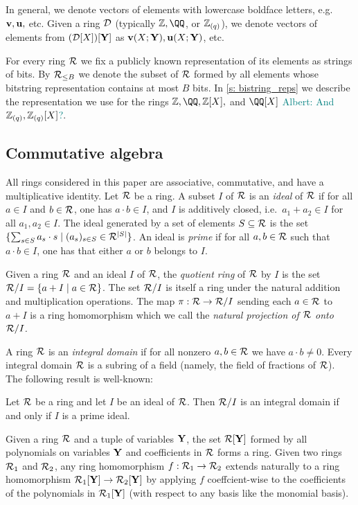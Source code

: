 \documentclass[11pt,letterpaper,usenames,dvipsnames]{article}
\newcommand{\albert}[1]{\textcolor{teal}{Albert: {#1}}}
\begin{document}
In general, we denote vectors of elements with lowercase boldface letters, e.g.\ $\mathbf{v},\mathbf{u},$ etc. Given a ring $\mathcal{D}$ (typically $\ZZ, \QQ$, or $\mathbb{Z}_{(q)}$), we denote vectors of elements from $(\mathcal{D}[X])[\mathbf{Y}]$ as $\mathbf{v}(X;\mathbf{Y}), \mathbf{u}(X;\mathbf{Y})$, etc.


For every ring $\mathcal{R}$  we fix a publicly known representation of its elements as strings of bits. By $\mathcal{R}_{\leq B}$ we denote the subset of $\mathcal{R}$ formed by all elements whose bitstring representation contains at most $B$ bits. In \cref{s: bistring_reps} we describe the representation we use for the rings $\ZZ,\QQ, \ZZ[X],$ and $\QQ[X]$ \albert{And $\mathbb{Z}_{(q)},\mathbb{Z}_{(q)}[X]$?}.


\subsection{Commutative algebra}
All rings considered in this paper are associative, commutative, and have a multiplicative identity. Let $\mathcal{R}$ be a ring. A subset $I$ of $\mathcal{R}$ is an \emph{ideal} of $\mathcal{R}$ if for all $a\in I$ and $b\in \mathcal{R}$, one has $a\cdot b \in I$, and $I$ is additively closed, i.e.\ $a_1 + a_2 \in I$ for all $a_1, a_2\in I$. The ideal generated by a set of elements $S\subseteq \mathcal{R}$ is the set $\{\sum_{s\in S} a_s \cdot s \mid (a_s)_{s\in S}\in \mathcal{R}^{|S|}\}$. An ideal is \emph{prime} if for all $a,b\in \mathcal{R}$ such that $a\cdot b \in I$, one has that either $a$ or $b$ belongs to $I$. 

Given a ring $\mathcal{R}$ and an ideal $I$ of $\mathcal{R}$, the \emph{quotient ring} of $\mathcal{R}$ by $I$ is the set  $\mathcal{R}/I =\{a+I \mid a\in \mathcal{R}\}$. The set $\mathcal{R}/I$ is itself a ring under the natural addition and multiplication operations.  The map $\pi:\mathcal{R}\to \mathcal{R}/I$ sending each $a\in \mathcal{R}$ to $a+I$ is a ring homomorphism which we call the \emph{natural projection of $\mathcal{R}$ onto $\mathcal{R}/I$.}

A ring $\mathcal{R}$ is an \emph{integral domain} if for all nonzero $a,b\in \mathcal{R}$ we have $a\cdot b\neq 0$. Every integral domain $\mathcal{R}$ is a subring of a field (namely, the field of fractions of $\mathcal{R}$). The following result is well-known:
\begin{remark}\label{r: domain_prime}
Let $\mathcal{R}$ be a ring and let $I$  be an ideal of $\mathcal{R}$. Then $\mathcal{R}/I$ is an integral domain if and only if $I$ is a prime ideal.
\end{remark}

Given a ring $\mathcal{R}$ and a tuple of variables $\mathbf{Y}$, the set $\mathcal{R}[\mathbf{Y}]$ formed by all polynomials on variables $\mathbf{Y}$ and coefficients in $\mathcal{R}$ forms a ring. Given two rings $\mathcal{R}_1$ and $\mathcal{R}_2$, any ring homomorphism $f:\mathcal{R}_1 \to \mathcal{R}_2$  extends naturally to a ring homomorphism $\mathcal{R}_1[\mathbf{Y}] \to \mathcal{R}_2[\mathbf{Y}]$ by applying $f$ coeffcient-wise to the coefficients of the polynomials in $\mathcal{R}_1[\mathbf{Y}]$ (with respect to any basis like the monomial basis). 
\end{document}
